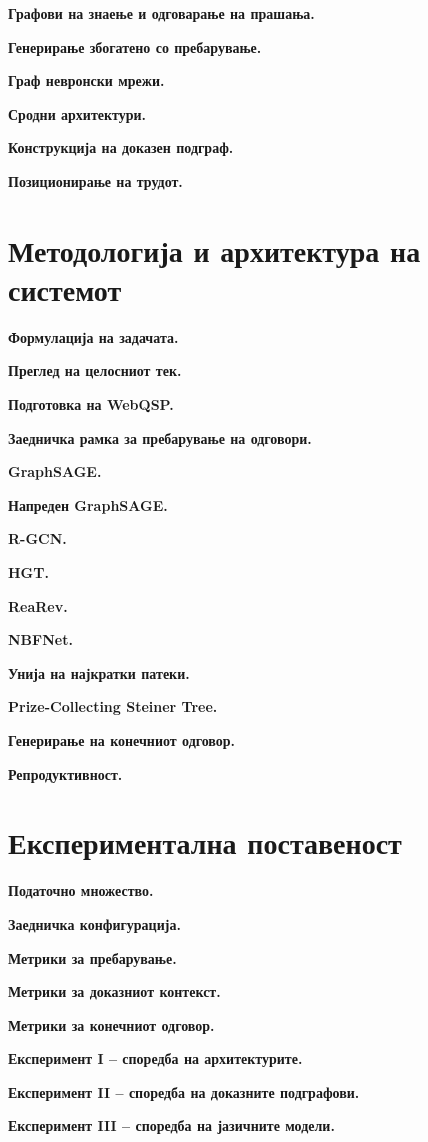 \documentclass[14pt]{extarticle}
\begin{document}
\textbf{Графови на знаење и одговарање на прашања.}

\textbf{Генерирање збогатено со пребарување.}

\textbf{Граф невронски мрежи.}

\textbf{Сродни архитектури.}

\textbf{Конструкција на доказен подграф.}

\textbf{Позиционирање на трудот.}

\section{Методологија и архитектура на системот}

\textbf{Формулација на задачата.}

\textbf{Преглед на целосниот тек.}

\textbf{Подготовка на WebQSP.}

\textbf{Заедничка рамка за пребарување на одговори.}

\textbf{GraphSAGE.}

\textbf{Напреден GraphSAGE.}

\textbf{R-GCN.}

\textbf{HGT.}

\textbf{ReaRev.}

\textbf{NBFNet.}

\textbf{Унија на најкратки патеки.}

\textbf{Prize-Collecting Steiner Tree.}

\textbf{Генерирање на конечниот одговор.}

\textbf{Репродуктивност.}

\section{Експериментална поставеност}

\textbf{Податочно множество.}

\textbf{Заедничка конфигурација.}

\textbf{Метрики за пребарување.}

\textbf{Метрики за доказниот контекст.}

\textbf{Метрики за конечниот одговор.}

\textbf{Експеримент I -- споредба на архитектурите.}

\textbf{Експеримент II -- споредба на доказните подграфови.}

\textbf{Експеримент III -- споредба на јазичните модели.}
\end{document}
